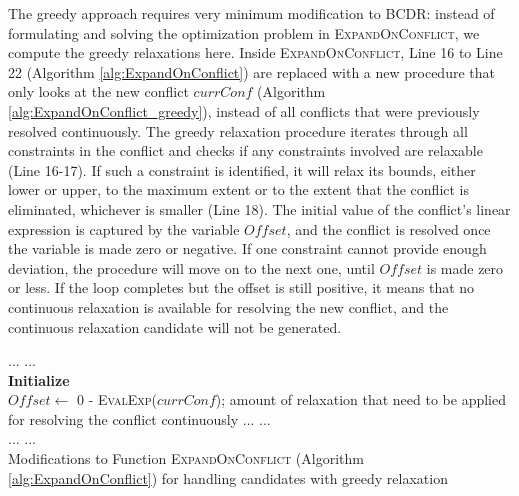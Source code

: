 \documentclass[jair,twoside,11pt,theapa]{article}
\let\oldnl\nl%
\newcommand{\nonl}{\renewcommand{\nl}{\let\nl\oldnl}}%
\begin{document}
The greedy approach requires very minimum modification to BCDR: instead of
formulating and solving the optimization problem in \textsc{ExpandOnConflict}, we compute the greedy relaxations here. Inside
\textsc{ExpandOnConflict}, Line 16 to Line 22 (Algorithm \ref{alg:ExpandOnConflict}) are replaced with a new procedure
that only looks at the new conflict $\mathit{currConf}$  (Algorithm \ref{alg:ExpandOnConflict_greedy}), instead of all conflicts that
were previously resolved continuously. The
greedy relaxation procedure iterates through all constraints in the conflict
and checks if any constraints involved are relaxable (Line 16-17). If such a
constraint is identified, it will relax its bounds, either lower or upper, to
the maximum extent or to the extent that the conflict is eliminated, whichever
is smaller (Line 18). The initial value of the conflict's linear expression is
captured by the variable $\mathit{Offset}$, and the conflict is resolved once the
variable is made zero or negative. If one constraint cannot provide enough
deviation, the procedure will move on to the next one, until $\mathit{Offset}$ is made
zero or less. If the loop completes but the offset is still positive, it means
that no continuous relaxation is available for resolving the new conflict, and
the continuous relaxation candidate will not be generated.


\begin{algorithm}[htb!]
	\setcounter{AlgoLine}{15}
	\nonl ... ...\\
	\nonl \textbf{Initialize}\\
	\nonl {$\mathit{Offset}\leftarrow$ 0 - \textsc{EvalExp($\mathit{currConf}$)}};  amount of relaxation that need to be applied for resolving the conflict continuously\;
	\nonl ... ...\\
	\nonl ... ...\\
	\caption{Modifications to Function \textsc{ExpandOnConflict} (Algorithm \ref{alg:ExpandOnConflict}) for handling candidates with greedy relaxation}
	\label{alg:ExpandOnConflict_greedy}
\end{algorithm}
\end{document}
